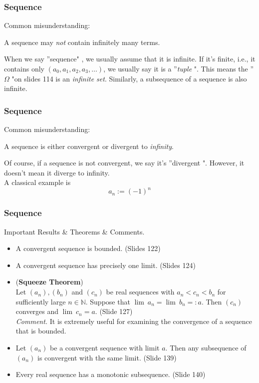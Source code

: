 \documentclass[12pt, t]{beamer}
\renewcommand{\emph}[1]{{\color{Turquoise3}\textsl{#1}}}
\begin{document}
\begin{frame}
    \frametitle{Sequence}
    Common misunderstanding:
    \begin{center}
        A sequence may \emph{not} contain infinitely many terms.
    \end{center}
    \hspace{1em} When we say ''sequence" , we usually assume that it is infinite. If it's finite, i.e., it
    contains only $(a_0,a_1,a_2,a_3,\dots)$, we usually say it is a ''\emph{tuple} ". This means
    the ''$\Omega$ "on slides 114 is an \emph{infinite set}. Similarly, a subsequence of a sequence is also infinite.
\end{frame}

\begin{frame}
    \frametitle{Sequence}
    Common misunderstanding:
    \begin{center}
        A sequence is either convergent or divergent to \emph{infinity}.
    \end{center}
    \hspace{1em} Of course, if a sequence is not convergent, we say it's ''divergent ". However,
    it doesn't mean it diverge to infinity.\\
    \hspace{1em}A classical example is
    \begin{equation*}
        a_n:=(-1)^n
    \end{equation*}
\end{frame}

\begin{frame}
    \frametitle{Sequence}
    Important Results \& Theorems \& Comments.
    \begin{itemize}
        \item A convergent sequence is bounded. (Slides 122)
        \item A convergent sequence has precisely one limit. (Slides 124)
        \item (\textbf{Squeeze Theorem}) \\Let $(a_n),(b_n)$ and $(c_n)$ be real sequences with $a_n<c_n<b_n$
              for sufficiently large $n\in\mathbb{N}$. Suppose that $\lim\ a_n=\lim\ b_n=:a$. Then
              $(c_n)$ converges and $\lim\ c_n=a$. (Slide 127)\\
              \emph{Comment.} It is extremely useful for examining the convergence of a sequence that is bounded.
        \item Let $(a_n)$ be a convergent sequence with limit $a$. Then any subsequence of $(a_n)$
              is convergent with the same limit. (Slide 139)
        \item Every real sequence has a monotonic subsequence. (Slide 140)
    \end{itemize}
\end{frame}
\end{document}
